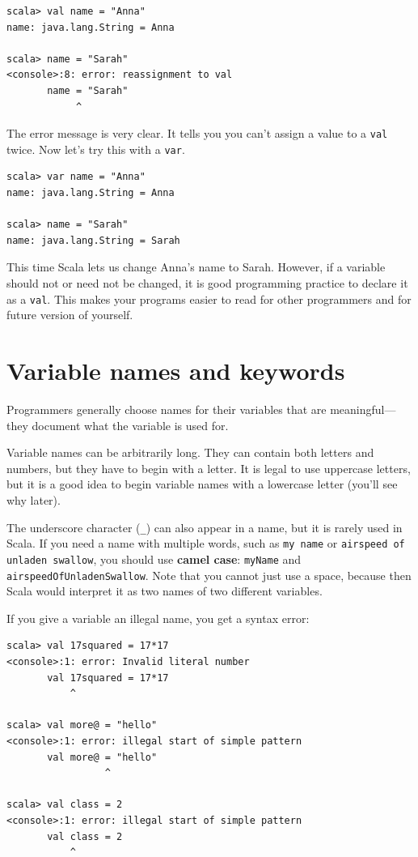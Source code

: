 \documentclass[10pt]{book}
\begin{document}
\beforeverb
\begin{verbatim}
scala> val name = "Anna"
name: java.lang.String = Anna

scala> name = "Sarah"
<console>:8: error: reassignment to val
       name = "Sarah"
            ^
\end{verbatim}
\afterverb

The error message is very clear. It tells you you can't assign a value to a \verb#val# twice. 
Now let's try this with a \verb#var#.

\beforeverb
\begin{verbatim}
scala> var name = "Anna"
name: java.lang.String = Anna

scala> name = "Sarah"
name: java.lang.String = Sarah
\end{verbatim}
\afterverb

This time Scala lets us change Anna's name to Sarah. However, if a variable should not or need not be changed, it is good
programming practice to declare it as a \verb#val#. This makes your programs easier to read for other programmers and for future
version of yourself.

\section{Variable names and keywords}

Programmers generally choose names for their variables that are meaningful---they document what the variable is used for.

Variable names can be arbitrarily long.  They can contain both letters and numbers, but they have to begin with a letter. It is legal to use uppercase letters, but it is a good idea to begin variable names with a lowercase letter (you'll see why later).

The underscore character (\verb"_") can also appear in a name, but it is rarely used in Scala.
If you need a name with multiple words, such as \verb"my name" or \verb"airspeed of unladen swallow", you should use {\bf camel case}: \verb"myName" and \verb"airspeedOfUnladenSwallow". Note that you cannot just use a space, because then Scala would interpret it as two names of two different variables.


If you give a variable an illegal name, you get a syntax error:

\beforeverb
\begin{verbatim}
scala> val 17squared = 17*17
<console>:1: error: Invalid literal number
       val 17squared = 17*17
           ^

scala> val more@ = "hello"
<console>:1: error: illegal start of simple pattern
       val more@ = "hello"
                 ^

scala> val class = 2
<console>:1: error: illegal start of simple pattern
       val class = 2
           ^
\end{verbatim}
\afterverb
\end{document}
